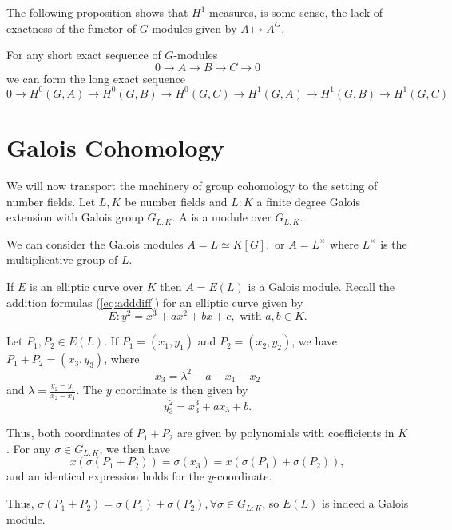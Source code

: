 \documentclass[12pt, a4paper]{report}
\begin{document}
The following proposition shows that $H^1$ measures, is some sense, the lack of
exactness of the functor of $G$-modules given by $A \mapsto A^G.$

\begin{prop}
  For any short exact sequence of $G$-modules
  \[ 0 \rightarrow A \rightarrow B \rightarrow C \rightarrow 0\]
  we can form the long exact sequence
  \[ 0 \rightarrow H^0(G, A) \rightarrow H^0(G,B) \rightarrow H^0(G,C)
    \rightarrow H^1(G, A) \rightarrow H^1(G,B) \rightarrow H^1(G,C) \]
\end{prop}

\section{Galois Cohomology}

We will now transport the machinery of group cohomology to the setting of
number fields.
Let $L, K$ be number fields and $L : K$ a finite degree Galois
extension with Galois group $G_{L:K}$.
A  is a module over $G_{L:K}$.

\begin{example}
  We can consider the Galois modules $A = L \simeq K[G], $ or $A =
  L^{\times}$ where $L^{\times}$ is the multiplicative group of $L$.
\end{example}

\begin{example}
  If $E$ is an elliptic curve over $K$ then $A = E(L)$ is a Galois module.
  Recall the addition formulas (\autoref{eq:adddiff}) for an elliptic curve given by 
  \[E: y^2 = x^3 + ax^2 + bx + c, \text{ with } a, b \in K.\]
  
  Let $P_1, P_2 \in E(L)$. 
  If $P_1 = (x_1, y_1)$ and $P_2 = (x_2,y_2)$, we have $P_1+P_2 = (x_3,y_3)$,
  where
  \[x_3 = \lambda^2 - a - x_1 - x_2\]
  and $\lambda = \frac{y_2-y_1}{x_2-x_1}.$ The $y$ coordinate is then given by
  \[y_3^2 = x_3^3 + ax_3 + b.\]
  
  Thus, both coordinates of $P_1+P_2$ are given by polynomials with coefficients
  in $K$. 
  For any $\sigma \in G_{L:K}$, we then have
  \[x(\sigma(P_1+P_2)) = \sigma(x_3) = x(\sigma(P_1) + \sigma(P_2)),\]
  and an identical expression holds for the $y$-coordinate.
  
  Thus, $\sigma(P_1+P_2) = \sigma(P_1) + \sigma(P_2), \forall \sigma \in
  G_{L:K}$, so $E(L)$ is indeed a Galois module. 

\end{example}
\end{document}
